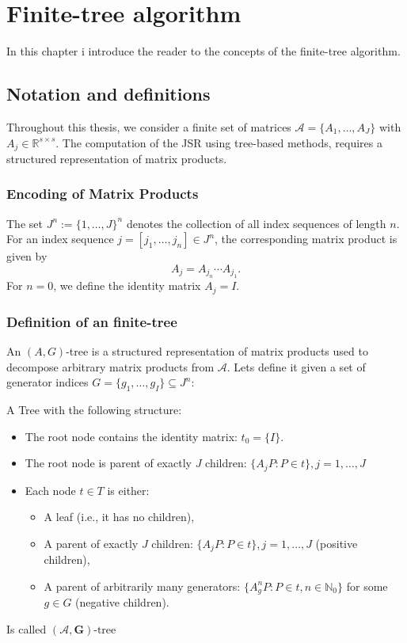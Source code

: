 
\chapter{Finite-tree algorithm}
\label{ch:finite-tree}
In this chapter i introduce the reader to the concepts of the finite-tree algorithm. 

\section{Notation and definitions}

Throughout this thesis, we consider a finite set of matrices \( \mathcal{A} = \{A_1, \dots, A_J\} \) with \( A_j \in \mathbb{R}^{s \times s} \). The computation of the JSR using tree-based methods, requires a structured representation of matrix products.

\subsection*{Encoding of Matrix Products}
The set \( J^n := \{1, \dots, J\}^n \) denotes the collection of all index sequences of length \( n \). For an index sequence \( j = [j_1, \dots, j_n] \in J^n \), the corresponding matrix product is given by
\[
    A_j = A_{j_n} \cdots A_{j_1}.
\]
For \( n = 0 \), we define the identity matrix \( A_j = I \).

\subsection*{Definition of an finite-tree}
\label{def:tree}
An \( (A,G) \)-tree is a structured representation of matrix products used to decompose arbitrary matrix products from $\mathcal{A}$. Lets define it given a set of generator indices \( G = \{g_1, \dots, g_I\} \subseteq J^n \):
\begin{definition}
    A Tree with the following structure: 
\begin{itemize}
    \item The root node contains the identity matrix: \( t_0 = \{I\} \).
    \item The root node is parent of exactly \( J \) children: \( \{A_j P : P \in t\}, j = 1, \dots, J \)
    \item Each node \( t \in T \) is either:
    \begin{itemize}
        \item A leaf (i.e., it has no children),
        \item A parent of exactly \( J \) children: \( \{A_j P : P \in t\}, j = 1, \dots, J \) (positive children),
        \item A parent of arbitrarily many generators: \( \{A_g^n P : P \in t, n \in \mathbb{N}_0\} \) for some \( g \in G \) (negative children).
    \end{itemize}
\end{itemize}
Is called $(\mathcal{A},\mathbf{G})\text{-tree}$
\end{definition}


